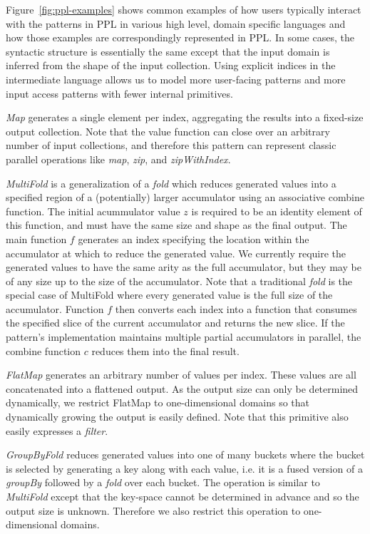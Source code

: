 

Figure~\ref{fig:ppl-examples} shows common examples of how users typically interact with
the patterns in PPL in various high level, domain specific languages
and how those examples are correspondingly represented in PPL. In some cases, the syntactic structure is
essentially the same except that the input domain is inferred from the shape of
the input collection. Using explicit indices in the intermediate language allows
us to model more user-facing patterns and more input access patterns with fewer internal primitives.

\emph{Map} generates a single element per index, aggregating the results into a fixed-size output collection.
Note that the value function can close over an arbitrary number of input collections, and therefore this pattern can represent classic parallel operations like \emph{map}, \emph{zip},
and \emph{zipWithIndex}.

\emph{MultiFold} is a generalization of a \emph{fold} which reduces generated values into a specified region of a (potentially) larger accumulator using an associative combine function.
The initial acummulator value $z$ is required to be an identity element of this function, and must have the same size and shape as the final output.
The main function $f$ generates an index specifying the location within the accumulator at which to reduce the generated value. We currently require the generated values to have the same arity as the full accumulator, but they may be of any size up to the size of the accumulator. Note that a traditional \emph{fold} is the special case of MultiFold where every generated value is the full size of the accumulator.
Function $f$ then converts each index into a function that consumes the specified
slice of the current accumulator and returns the new slice. If the pattern's
implementation maintains multiple partial accumulators in parallel, the combine
function $c$ reduces them into the final result.

\emph{FlatMap} generates an arbitrary number of values per index.
These values are all concatenated into a flattened output.
As the output size can only be determined dynamically, we restrict FlatMap to
one-dimensional domains so that dynamically growing the output is easily defined.
Note that this primitive also easily expresses a \emph{filter}.

\emph{GroupByFold} reduces generated values into one of many buckets where the bucket is selected by generating a key along with each value, i.e. it is a fused version of a \emph{groupBy} followed by a \emph{fold} over each bucket.
The operation is similar to \emph{MultiFold} except that the key-space cannot be determined in advance and so the output size is unknown.
Therefore we also restrict this operation to one-dimensional domains.




